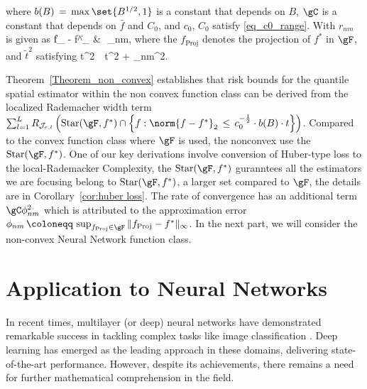 \documentclass[twoside,11pt]{article}
\begin{document}
\begin{theorem}

where $b(B) \,=\, \max\set{B^{1/2},1}  $ is a constant that depends on $B$, $\gC$ is a constant that depends on $\bar f$ and $C_0$, and $c_0$, $C_0$ satisfy \eqref{eq_c0_range}.  With $r_
{nm}$ is given as 
\bea  
\| f_{} - f^\ast \|_{\infty} &\,\leq\, \phi_{nm}, 
\bea 
where the $f_{\text{Proj}}$ denotes the projection of $f^{\ast}$ in $\gF$, and $\tilde t^2$ satisfying 
\bea
\tilde t^2 \,\coloneqq\, t^2 +  \gC\phi_{nm}^2. 
\bea
\end{theorem}

 
Theorem~\ref{Theorem_non_convex} establishes that risk bounds for the quantile spatial estimator within the non convex function class can be derived from the localized Rademacher width term \\ $\sum_{l=1}^L R_{\mathcal{J}_{e,l}}\left(\text{Star}(\gF, f^\ast)\cap \left\{f: \norm{f-f^*}_2\,\leq\, c_0^{-\frac{1}{2}}\cdot b(B)\cdot t\right\}\right)$. Compared to the convex function class where $\gF$ is used, the nonconvex use the $\text{Star}(\gF, f^\ast)$. One of our key derivations involve conversion of Huber-type loss to the local-Rademacker Complexity, the  $\text{Star}(\gF, f^\ast)$ guranntees all the estimators we are focusing belong to  $\text{Star}(\gF, f^\ast)$, a larger set compared to $\gF$, the details are in Corollary~\ref{cor:huber loss}. 
The rate of convergence has an additional term $\gC\phi_{nm}^2$ which is attributed to the approximation error $\phi_{nm}\,\coloneqq\, \sup_{f_{\text{Proj}} \in \gF} \| f_{\text{Proj}} - f^\ast \|_{\infty}$. In the next part, we will consider the non-convex Neural Network function class. 

\section{Application to Neural Networks}

In recent times, multilayer (or deep) neural networks have demonstrated remarkable success in tackling complex tasks like image classification \cite{krizhevsky2017imagenet}. Deep learning has emerged as the leading approach in these domains, delivering state-of-the-art performance. However, despite its achievements, there remains a need for further mathematical comprehension in the field.
\end{document}
